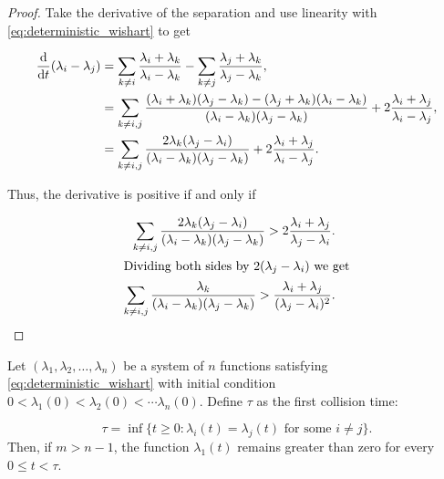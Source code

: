 \begin{proof}

    Take the derivative of the separation and use linearity with \eqref{eq:deterministic_wishart} to get

    \begin{align*}
        \frac{\mathrm d}{\mathrm d t}(\lambda_i - \lambda_j) &= \sum_{k\neq i} \frac{\lambda_i + \lambda_k}{\lambda_i - \lambda_k} - \sum_{k\neq j} \frac{\lambda_j + \lambda_k}{\lambda_j - \lambda_k}, \\
        &= \sum_{k \neq i,j} \frac{ (\lambda_i + \lambda_k)(\lambda_j - \lambda_k) - (\lambda_j + \lambda_k)(\lambda_i - \lambda_k) }{(\lambda_i - \lambda_k)(\lambda_j - \lambda_k)} + 2\frac{\lambda_i + \lambda_j}{\lambda_i - \lambda_j},\\
        &= \sum_{k\neq i,j} \frac{2\lambda_k(\lambda_j - \lambda_i)}{(\lambda_i-\lambda_k)(\lambda_j-\lambda_k)} + 2 \frac{\lambda_i + \lambda_j}{\lambda_i - \lambda_j}.
    \end{align*}

    Thus, the derivative is positive if and only if 

    \begin{align*}
        \sum_{k\neq i,j} \frac{2\lambda_k(\lambda_j - \lambda_i)}{(\lambda_i-\lambda_k)(\lambda_j-\lambda_k)} > 2 \frac{\lambda_i + \lambda_j}{\lambda_j - \lambda_i}.\\
        \intertext{Dividing both sides by $2(\lambda_j - \lambda_i)$ we get}
        \sum_{k\neq i,j} \frac{\lambda_k}{(\lambda_i-\lambda_k)(\lambda_j-\lambda_k)} >  \frac{\lambda_i + \lambda_j}{(\lambda_j - \lambda_i)^2}.
    \end{align*}
\end{proof}

\begin{lemma}
    Let $(\lambda_1,\lambda_2, \dots, \lambda_n)$ be a system of $n$ functions satisfying \eqref{eq:deterministic_wishart} with initial condition $0<\lambda_1(0) < \lambda_2(0) < \cdots \lambda_n(0)$. Define $\tau$ as the first collision time:

    \[ \tau = \inf\{ t \ge 0 \colon \lambda_i(t) = \lambda_j(t) \textrm{ for some } i \neq j \}. \]
    Then, if $m> n-1$, the function $\lambda_1(t)$ remains greater than zero for every $0 \le t < \tau$.
\end{lemma}

